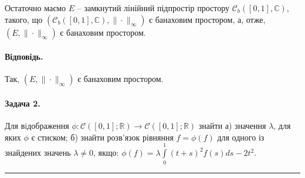 \documentclass[a5paper, 20pt, titlepage]{article}
\begin{document}
Остаточно маємо $E$ -- замкнутий лінійний підпростір простору $ \mathcal{C}_b  \left( [0, 1], \mathbb{C} \right)$, такого, що $\left( \mathcal{C}_b  \left( [0, 1], \mathbb{C} \right), \| \cdot \|_\infty \right)$ є банаховим простором, а, отже, $\left( E, \| \cdot \|_\infty \right)$ є банаховим простором.

\paragraph{Відповідь.}  Так,  $\left( E, \| \cdot \|_\infty \right)$ є банаховим простором.

\vspace{4mm}


\paragraph{Задача 2.} Для вiдображення $\phi: \mathcal{C} \left( [0, 1]; \mathbb{R} \right) \rightarrow \mathcal{C} \left( [0, 1]; \mathbb{R} \right)$
знайти а) значення $\lambda$, для яких $\phi$ є стиском; б) знайти розв'язок рівняння $f = \phi(f)$ для одного із знайдених значень $\lambda \neq 0$, якщо: \newline $\phi(f) = \lambda \int \limits_{0}^{1} (t + s)^2 f(s) ds - 2t^2$.

\noindent\rule{4cm}{0.4pt}
\end{document}
